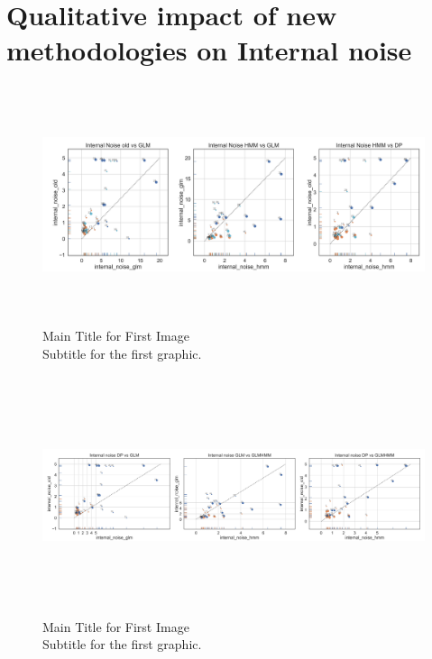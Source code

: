 \section{Qualitative impact of new methodologies on Internal noise}
\begin{figure}[H]
    \centering
    \includegraphics[width=17cm,height=7cm]{MainLayout/Images/chapter8/internal_noise_comparison_types_glms.jpg}
    \caption{Main Title for First Image \\ \small Subtitle for the first graphic.}
    \label{fig:internal_noise_comparison_types_glms}
\end{figure}
\begin{figure}[H]
    \centering
    \includegraphics[width=17cm,height=7cm]{MainLayout/Images/chapter8/internal_noise_comparison_glms.jpg}
    \caption{Main Title for First Image \\ \small Subtitle for the first graphic.}
    \label{fig:internal_noise_comparison_glms}
\end{figure}
